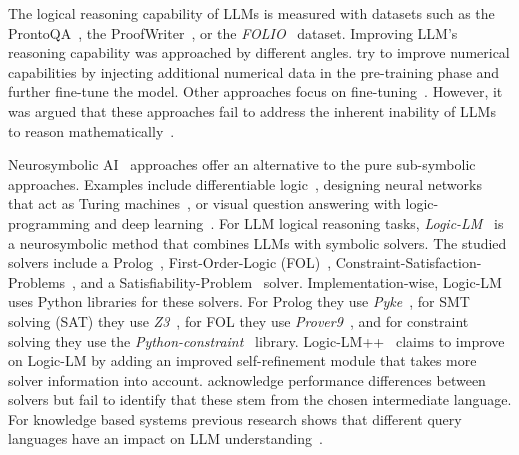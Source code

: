 The logical reasoning capability of LLMs is measured with datasets such as
the ProntoQA~\citep{saparov_language_2023},  
the ProofWriter~\citep{tafjord_proofwriter_2021}, or
the \textit{FOLIO}~\citep{han_folio_2024} dataset.
%
%
Improving LLM's reasoning capability was approached by different angles.
\citet{geva_injecting_2020} try to improve numerical capabilities
by injecting additional numerical data in the pre-training phase
and further fine-tune the model.
Other approaches focus on fine-tuning~\citep{yang_generating_2022}.
However, it was argued that these approaches fail to address the inherent inability of LLMs to reason 
mathematically~\citep{panas_can_2024}.

Neurosymbolic AI~\citep{garcez_neurosymbolic_2023} approaches offer an alternative to the pure sub-symbolic approaches.
Examples include differentiable logic~\citep{badreddine_logic_2022},
designing neural networks that act as Turing machines~\citep{siegelmann_computational_1995},
or visual question answering with logic-programming and
deep learning~\citep{eiter_logic-based_2023}.
For LLM logical reasoning tasks, 
\textit{Logic-LM}~\citep{pan_logic-lm_2023} is a neurosymbolic method that
combines LLMs with symbolic solvers.
The studied solvers include a Prolog~\citep{korner_fifty_2022}, First-Order-Logic (FOL)~\citep{enderton_mathematical_1972}, Constraint-Satisfaction-Problems~\citep{kumar_algorithms_1992}, and a Satisfiability-Problem~\citep{cook_complexity_1971} solver.
Implementation-wise, Logic-LM uses Python libraries for these solvers.
For Prolog they use \textit{Pyke}~\citep{frederiksen_applying_2008},
for SMT solving (SAT) they use \textit{Z3}~\citep{de_moura_z3_2008},
for FOL they use \textit{Prover9}~\citep{mccune_prover9_2010},
and for constraint solving they use the \textit{Python-constraint}~\citep{niemeyer_python-constraint_2024} library.
Logic-LM++~\citep{kirtania_logic-lm_2024} claims to improve on Logic-LM
by adding an improved self-refinement module that
takes more solver information into account.
\citet{lam_closer_2024} acknowledge performance differences between solvers
but fail to identify that these stem from the chosen intermediate language.
For knowledge based systems previous research shows that different query languages have an
impact on LLM understanding~\citep{liu_how_2024}.

